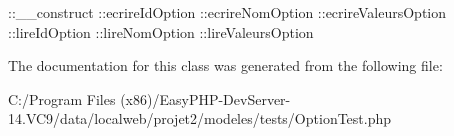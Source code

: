 \+::\+\_\+\+\_\+construct  \+::ecrire\+Id\+Option  \+::ecrire\+Nom\+Option  \+::ecrire\+Valeurs\+Option  \+::lire\+Id\+Option  \+::lire\+Nom\+Option  \+::lire\+Valeurs\+Option 

The documentation for this class was generated from the following file\+:\begin{DoxyCompactItemize}
\item 
C\+:/\+Program Files (x86)/\+Easy\+P\+H\+P-\/\+Dev\+Server-\/14.\+V\+C9/data/localweb/projet2/modeles/tests/Option\+Test.\+php\end{DoxyCompactItemize}
